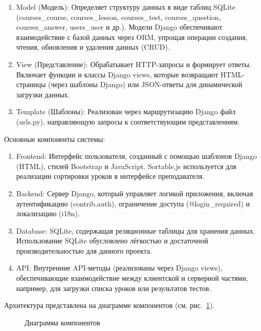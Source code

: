 \begin{enumerate}
	\item {Model} (Модель): Определяет структуру данных в виде таблиц SQLite (courses\_course, courses\_lesson, courses\_test, courses\_question, courses\_answer, users\_user и др.). Модели Django обеспечивают взаимодействие с базой данных через ORM, упрощая операции создания, чтения, обновления и удаления данных (CRUD).
	\item {View} (Представление): Обрабатывает HTTP-запросы и формирует ответы. Включает функции и классы Django views, которые возвращают HTML-страницы (через шаблоны Django) или JSON-ответы для динамической загрузки данных.
	\item {Template} (Шаблоны): Реализован через маршрутизацию Django файл (urls.py), направляющую запросы к соответствующим представлениям.
\end{enumerate}

Основные компоненты системы:
\begin{enumerate}
	\item {Frontend}: Интерфейс пользователя, созданный с помощью шаблонов Django (HTML), стилей Bootstrap и JavaScript. Sortable.js используется для реализации сортировки уроков в интерфейсе преподавателя.
	\item {Backend}: Сервер Django, который управляет логикой приложения, включая аутентификацию (contrib.auth), ограничение доступа (@login\_required) и локализацию (i18n).
	\item {Database}: SQLite, содержащая реляционные таблицы для хранения данных. Использование SQLite обусловлено лёгкостью и достаточной производительностью для данного проекта.
	\item {API}: Внутренние API-методы (реализованы через Django views), обеспечивающие взаимодействие между клиентской и серверной частями, например, для загрузки списка уроков или результатов тестов.
\end{enumerate}

Архитектура представлена на диаграмме компонентов (см. рис.~\ref{diag:image}).
\newpage
\begin{figure}[h]
	\caption{Диаграмма компонентов}
	\label{diag:image}
\end{figure}

